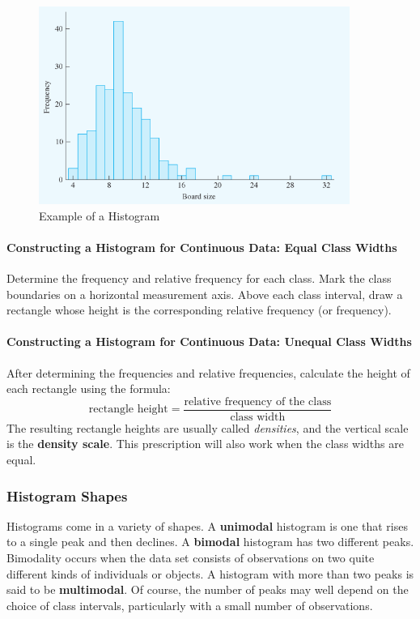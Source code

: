 \documentclass{article}
\newcommand{\p}[1]{\paragraph{#1}} %
\begin{document}
		\begin{figure}[!htb]
		   \centering
		   \includegraphics[width=4in]{histo_example.jpg} 
		   \caption{Example of a Histogram}
		   \label{fig:histo_example}
		\end{figure}
	
	\p{Constructing a Histogram for Continuous Data: Equal Class Widths}
	Determine the frequency and relative frequency for each class. Mark the class boundaries 
	on a horizontal measurement axis. Above each class interval, draw a rectangle whose 
	height is the corresponding relative frequency (or frequency).
	
	\p{Constructing a Histogram for Continuous Data: Unequal Class Widths}
	After determining the frequencies and relative frequencies, calculate the height of each 
	rectangle using the formula:
	\[ \text{rectangle height} = \frac{\text{relative frequency of the class}}{\text{class width}} \]
	The resulting rectangle heights are usually called \emph{densities}, and the vertical scale 
	is the \textbf{density scale}. This prescription will also work when the class widths are 
	equal.
	
		\subsubsection{Histogram Shapes}
		Histograms come in a variety of shapes. A \textbf{unimodal} histogram is one that rises to 
		a single peak and then declines. A \textbf{bimodal} histogram has two different peaks. 
		Bimodality occurs when the data set consists of observations on two quite different kinds 
		of individuals or objects. A histogram with more than two peaks is said to be 
		\textbf{multimodal}. Of course, the number of peaks may well depend on the choice of 
		class intervals, particularly with a small number of observations. \\
		
\end{document}
